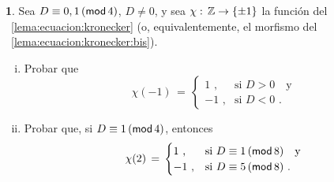 \theoremstyle{definition}
\newtheorem{ejerEcuacion}{\ejername}[section]


\begin{ejerEcuacion}\label{ejer:ecuacion:kronecker}
	Sea $D\equiv 0,1\tmodulo[4]$, $D\neq 0$, y sea
	$\chi:\,\Enteros\rightarrow\cuadratico$ la funci\'on del
	\lemaname~\ref{lema:ecuacion:kronecker} (o, equivalentemente,
	el morfismo del \lemaname~\ref{lema:ecuacion:kronecker:bis}).
	\begin{enumerate}[(i)]
		\item\label{item:ejer:iecuacion:kronecker:menos-uno}
			Probar que
			\begin{displaymath}
				\chi(-1)\,=\,
					\begin{cases}
						1 \text{ ,} & \text{si }
							D>0\quad\text{y} \\
						-1\text{ ,} & \text{si }
							D<0\text{ .}
					\end{cases}
			\end{displaymath}
		\item\label{item:ejer:ecuacion:kronecker:dos}
			Probar que, si $D\equiv 1\tmodulo[4]$, entonces
			\begin{displaymath}
				\chi(2)\,=\,
					\begin{cases}
						1 \text{ ,} & \text{si }
							D\equiv 1\tmodulo[8]
							\quad\text{y} \\
						-1\text{ ,} & \text{si }
							D\equiv 5\tmodulo[8]
							\text{ .}
					\end{cases}
			\end{displaymath}
	\end{enumerate}
\end{ejerEcuacion}


